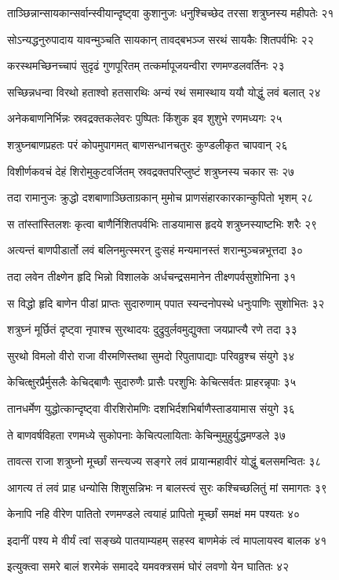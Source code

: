 ताञ्छिन्नान्सायकान्सर्वान्स्वीयान्दृष्ट्वा कुशानुजः
धनुश्चिच्छेद तरसा शत्रुघ्नस्य महीपतेः २१

सोऽन्यद्धनुरुपादाय यावन्मुञ्चति सायकान्
तावद्बभञ्ज सरथं सायकैः शितपर्वभिः २२

करस्थमच्छिनच्चापं सुदृढं गुणपूरितम्
तत्कर्मापूजयन्वीरा रणमण्डलवर्तिनः २३

सच्छिन्नधन्वा विरथो हताश्वो हतसारथिः
अन्यं रथं समास्थाय ययौ योद्धुं लवं बलात् २४

अनेकबाणनिर्भिन्नः स्रवद्रक्तकलेवरः
पुष्पितः किंशुक इव शुशुभे रणमध्यगः २५

शत्रुघ्नबाणप्रहतः परं कोपमुपागमत्
बाणसन्धानचतुरः कुण्डलीकृत चापवान् २६

विशीर्णकवचं देहं शिरोमुकुटवर्जितम्
स्रवद्रक्तपरिप्लुष्टं शत्रुघ्नस्य चकार सः २७

तदा रामानुजः क्रुद्धो दशबाणाञ्छिताग्रकान्
मुमोच प्राणसंहारकारकान्कुपितो भृशम् २८

स तांस्तांस्तिलशः कृत्वा बाणैर्निशितपर्वभिः
ताडयामास हृदये शत्रुघ्नस्याष्टभिः शरैः २९

अत्यन्तं बाणपीडार्तो लवं बलिनमुत्स्मरन्
दुःसहं मन्यमानस्तं शरान्मुञ्चन्नभूत्तदा ३०

तदा लवेन तीक्ष्णेन हृदि भिन्नो विशालके
अर्धचन्द्रसमानेन तीक्ष्णपर्वसुशोभिना ३१

स विद्धो हृदि बाणेन पीडां प्राप्तः सुदारुणाम्
पपात स्यन्दनोपस्थे धनुःपाणिः सुशोभितः ३२

शत्रुघ्नं मूर्छितं दृष्ट्वा नृपाश्च सुरथादयः
दुद्रुवुर्लवमुद्युक्ता जयप्राप्त्यै रणे तदा ३३

सुरथो विमलो वीरो राजा वीरमणिस्तथा
सुमदो रिपुतापाद्याः परिवव्रुश्च संयुगे ३४

केचित्क्षुरप्रैर्मुसलैः केचिद्बाणैः सुदारुणैः
प्रासैः परशुभिः केचित्सर्वतः प्राहरन्नृपाः ३५

तानधर्मेण युद्धोत्कान्दृष्ट्वा वीरशिरोमणिः
दशभिर्दशभिर्बाणैस्ताडयामास संयुगे ३६

ते बाणवर्षविहता रणमध्ये सुकोपनाः
केचित्पलायिताः केचिन्मुमुहुर्युद्धमण्डले ३७

तावत्स राजा शत्रुघ्नो मूर्च्छां सन्त्यज्य सङ्गरे
लवं प्रायान्महावीरं योद्धुं बलसमन्वितः ३८

आगत्य तं लवं प्राह धन्योसि शिशुसन्निभः
न बालस्त्वं सुरः कश्चिच्छलितुं मां समागतः ३९

केनापि नहि वीरेण पातितो रणमण्डले
त्वयाहं प्रापितो मूर्च्छां समक्षं मम पश्यतः ४०

इदानीं पश्य मे वीर्यं त्वां सङ्ख्ये पातयाम्यहम्
सहस्व बाणमेकं त्वं मापलायस्व बालक ४१

इत्युक्त्वा समरे बालं शरमेकं समाददे
यमवक्त्रसमं घोरं लवणो येन घातितः ४२

